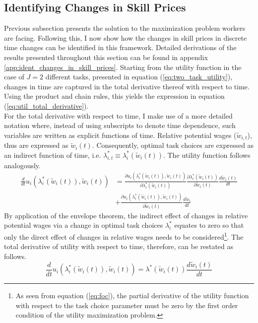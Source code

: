 \documentclass[../main.tex]{subfiles}
\begin{document}
\subsection{Identifying Changes in Skill Prices} \label{sec:identifying-changes-in-skill-prices}
Previous subsection presents the solution to the maximization problem workers are facing. Following this, I now show how the changes in skill prices in discrete time changes can be identified in this framework. Detailed derivations of the results presented throughout this section can be found in appendix \ref{app:ident_changes_in_skill_prices}. Starting from the utility function in the case of $J=2$ different tasks, presented in equation (\ref{eq:two_task_utility}), changes in time are captured in the total derivative thereof with respect to time. Using the product and chain rules, this yields the expression in equation (\ref{eq:util_total_derivative}).
\\
For the total derivative with respect to time, I make use of a more detailed notation where, instead of using subscripts to denote time dependence, such variables are written as explicit functions of time. Relative potential wages ($\tilde{w}_{i,t}$), thus are expressed as $\tilde{w}_{i}(t)$. Consequently, optimal task choices are expressed as an indirect function of time, i.e. $\lambda_{i,t}^* \equiv \lambda_i^*(\tilde{w}_i (t))$. The utility function follows analogously.
\begin{align} \label{eq:util_total_derivative}
	\frac{d }{dt} u_{i}(\lambda_i^*(\tilde{w}_i(t)), \tilde{w}_i(t)) &=	\frac{\partial u_i(\lambda_i^*(\tilde{w}_i(t)), \tilde{w}_i(t))}{\partial \lambda_i^*(\tilde{w}_i(t))} \frac{\partial \lambda_i^*(\tilde{w}_i(t))}{\partial \tilde{w}_i(t)}  \frac{d \tilde{w}_i(t)}{dt} \nonumber \\
	{} &+ \frac{\partial u_i(\lambda_i^*(\tilde{w}_i(t)), \tilde{w}_i(t))} {\partial \tilde{w}_i(t)} \frac{d \tilde{w}_i}{dt} 
\end{align}
By application of the envelope theorem, the indirect effect of changes in relative potential wages via a change in optimal task choices $\lambda_i^*$ equates to zero so that only the direct effect of changes in relative wages needs to be considered\footnote{As seen from equation (\ref{eq:foc}), the partial derivative of the utility function with respect to the task choice parameter must be zero by the first order condition of the utility maximization problem.}. The total derivative of utility with respect to time, therefore, can be restated as follows.
\begin{equation} \label{eq:util_derivative_env_th}
	\frac{d }{dt} u_{i}(\lambda_i^*(\tilde{w}_i(t)), \tilde{w}_i(t)) = \lambda^*(\tilde{w}_i(t)) \frac{d \tilde{w}_i (t)}{d t}
\end{equation}
\end{document}
